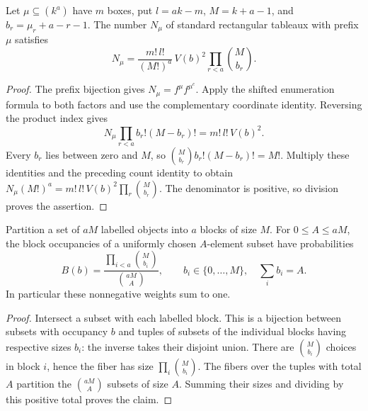\begin{lemma}
\label{lem:prefix-binomial-weight}
\leanok
Let $\mu\subseteq(k^a)$ have $m$ boxes, put $l=ak-m$, $M=k+a-1$,
and $b_r=\mu_r+a-r-1$. The number $N_\mu$ of standard rectangular
tableaux with prefix $\mu$ satisfies
\[
 N_\mu=\frac{m!\,l!}{(M!)^a}\,V(b)^2\prod_{r<a}\binom M{b_r}.
\]
\end{lemma}
\begin{proof}
The prefix bijection gives $N_\mu=f^\mu f^{\mu^c}$. Apply the
shifted enumeration formula to both factors and use the complementary
coordinate identity. Reversing the product index gives
\[
 N_\mu\prod_{r<a}b_r!(M-b_r)!=m!\,l!\,V(b)^2.
\]
Every $b_r$ lies between zero and $M$, so
$\binom M{b_r}b_r!(M-b_r)!=M!$. Multiply these identities and the
preceding count identity to obtain
$N_\mu(M!)^a=m!\,l!\,V(b)^2\prod_r\binom M{b_r}$.
The denominator is positive, so division proves the assertion.
\end{proof}

\begin{lemma}
\label{lem:labelled-occupancy}
\leanok
Partition a set of $aM$ labelled objects into $a$ blocks of size $M$.
For $0\leq A\leq aM$, the block occupancies of a uniformly chosen
$A$-element subset have probabilities
\[
 B(b)=\frac{\prod_{i<a}\binom M{b_i}}{\binom{aM}A},
 \qquad b_i\in\{0,\ldots,M\},\quad\sum_i b_i=A.
\]
In particular these nonnegative weights sum to one.
\end{lemma}
\begin{proof}
Intersect a subset with each labelled block. This is a bijection between
subsets with occupancy $b$ and tuples of subsets of the individual blocks
having respective sizes $b_i$: the inverse takes their disjoint union.
There are $\binom M{b_i}$ choices in block $i$, hence the fiber has size
$\prod_i\binom M{b_i}$. The fibers over the tuples with total $A$
partition the $\binom{aM}A$ subsets of size $A$. Summing their sizes
and dividing by this positive total proves the claim.
\end{proof}


